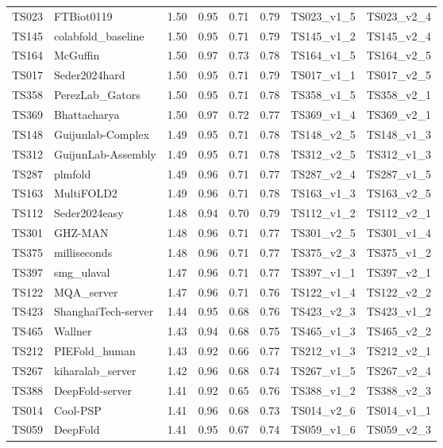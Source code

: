\begin{longtable}{llllllll}
TS023 & FTBiot0119 & 1.50 & 0.95 & 0.71 & 0.79 & TS023\_v1\_5 & TS023\_v2\_4 \\ 
TS145 & colabfold\_baseline & 1.50 & 0.95 & 0.71 & 0.79 & TS145\_v1\_2 & TS145\_v2\_4 \\ 
TS164 & McGuffin & 1.50 & 0.97 & 0.73 & 0.78 & TS164\_v1\_5 & TS164\_v2\_5 \\ 
TS017 & Seder2024hard & 1.50 & 0.95 & 0.71 & 0.79 & TS017\_v1\_1 & TS017\_v2\_5 \\ 
TS358 & PerezLab\_Gators & 1.50 & 0.95 & 0.71 & 0.78 & TS358\_v1\_5 & TS358\_v2\_1 \\ 
TS369 & Bhattacharya & 1.50 & 0.97 & 0.72 & 0.77 & TS369\_v1\_4 & TS369\_v2\_1 \\ 
TS148 & Guijunlab-Complex & 1.49 & 0.95 & 0.71 & 0.78 & TS148\_v2\_5 & TS148\_v1\_3 \\ 
TS312 & GuijunLab-Assembly & 1.49 & 0.95 & 0.71 & 0.78 & TS312\_v2\_5 & TS312\_v1\_3 \\ 
TS287 & plmfold & 1.49 & 0.96 & 0.71 & 0.77 & TS287\_v2\_4 & TS287\_v1\_5 \\ 
TS163 & MultiFOLD2 & 1.49 & 0.96 & 0.71 & 0.78 & TS163\_v1\_3 & TS163\_v2\_5 \\ 
TS112 & Seder2024easy & 1.48 & 0.94 & 0.70 & 0.79 & TS112\_v1\_2 & TS112\_v2\_1 \\ 
TS301 & GHZ-MAN & 1.48 & 0.96 & 0.71 & 0.77 & TS301\_v2\_5 & TS301\_v1\_4 \\ 
TS375 & milliseconds & 1.48 & 0.96 & 0.71 & 0.77 & TS375\_v2\_3 & TS375\_v1\_2 \\ 
TS397 & smg\_ulaval & 1.47 & 0.96 & 0.71 & 0.77 & TS397\_v1\_1 & TS397\_v2\_1 \\ 
TS122 & MQA\_server & 1.47 & 0.96 & 0.71 & 0.76 & TS122\_v1\_4 & TS122\_v2\_2 \\ 
TS423 & ShanghaiTech-server & 1.44 & 0.95 & 0.68 & 0.76 & TS423\_v2\_3 & TS423\_v1\_2 \\ 
TS465 & Wallner & 1.43 & 0.94 & 0.68 & 0.75 & TS465\_v1\_3 & TS465\_v2\_2 \\ 
TS212 & PIEFold\_human & 1.43 & 0.92 & 0.66 & 0.77 & TS212\_v1\_3 & TS212\_v2\_1 \\ 
TS267 & kiharalab\_server & 1.42 & 0.96 & 0.68 & 0.74 & TS267\_v1\_5 & TS267\_v2\_4 \\ 
TS388 & DeepFold-server & 1.41 & 0.92 & 0.65 & 0.76 & TS388\_v1\_2 & TS388\_v2\_3 \\ 
TS014 & Cool-PSP & 1.41 & 0.96 & 0.68 & 0.73 & TS014\_v2\_6 & TS014\_v1\_1 \\ 
TS059 & DeepFold & 1.41 & 0.95 & 0.67 & 0.74 & TS059\_v1\_6 & TS059\_v2\_3 \\ 

\end{longtable}
